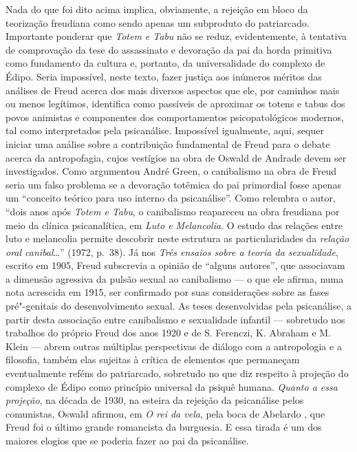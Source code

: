 Nada do que foi dito acima implica, obviamente, a rejeição em bloco da
teorização freudiana como sendo apenas um subproduto do patriarcado.
Importante ponderar que \emph{Totem e Tabu} não se reduz, evidentemente,
à tentativa de comprovação da tese do assassinato e devoração da pai da
horda primitiva como fundamento da cultura e, portanto, da
universalidade do complexo de Édipo. Seria impossível, neste texto,
fazer justiça aos inúmeros méritos das análises de Freud acerca dos mais
diversos aspectos que ele, por caminhos mais ou menos legítimos,
identifica como passíveis de aproximar os totens e tabus dos povos
animistas e componentes dos comportamentos psicopatológicos modernos,
tal como interpretados pela psicanálise. Impossível igualmente, aqui,
sequer iniciar uma análise sobre a contribuição fundamental de Freud
para o debate acerca da antropofagia, cujos vestígios na obra de Oswald
de Andrade devem ser investigados. Como argumentou André Green, o
canibalismo na obra de Freud seria um falso problema se a devoração
totêmica do pai primordial fosse apenas um ``conceito teórico para uso
interno da psicanálise''. Como relembra o autor, ``dois anos após
\emph{Totem e Tabu}, o canibalismo reapareceu na obra freudiana por meio
da clínica psicanalítica, em \emph{Luto e Melancolia}. O estudo das
relações entre luto e melancolia permite descobrir neste estrutura as
particularidades da \emph{relação oral canibal}\ldots{}'' (1972, p.~38).
Já nos \emph{Três ensaios sobre a teoria da sexualidade}, escrito
em 1905, Freud subscrevia a opinião de ``alguns autores'', que
associavam a dimensão agressiva da pulsão sexual ao canibalismo --- o
que ele afirma, numa nota acrescida em 1915, ser confirmado por suas
considerações sobre as fases pré"-genitais do desenvolvimento sexual. As
teses desenvolvidas pela psicanálise, a partir desta associação entre
canibalismo e sexualidade infantil --- sobretudo nos trabalhos do próprio
Freud dos anos 1920 e de S. Ferenczi, K. Abraham e M. Klein --- abrem
outras múltiplas perspectivas de diálogo com a antropologia e a
filosofia, também elas sujeitas à crítica de elementos que permaneçam
eventualmente reféns do patriarcado, sobretudo no que diz respeito à
projeção do complexo de Édipo como princípio universal da psiquê humana.
\emph{Quanto a essa projeção}, na década de 1930, na esteira da rejeição
da psicanálise pelos comunistas, Oswald afirmou, em \emph{O rei da
vela}, pela boca de Abelardo , que Freud foi o último grande romancista
da burguesia. E essa tirada é um dos maiores elogios que se poderia
fazer ao pai da psicanálise.

